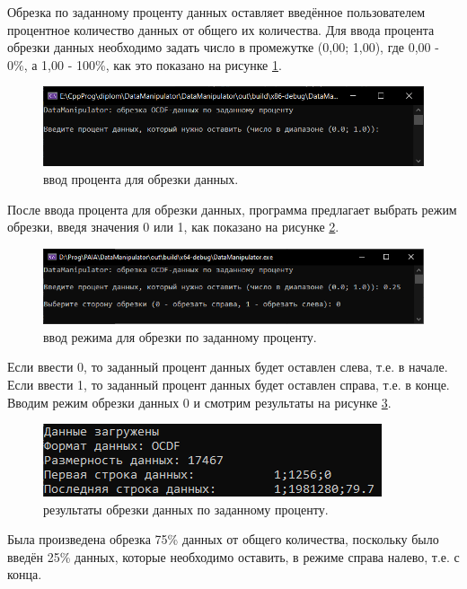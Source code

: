 {\standartFont

  \par Обрезка по заданному проценту данных оставляет введённое пользователем процентное количество данных от общего их количества. Для ввода процента обрезки данных необходимо задать число в промежутке (0,00; 1,00), где 0,00 - 0\%, а 1,00 - 100\%, как это показано на рисунке \ref{fig:OCDFcutper1}. 

  \begin{figure}[H]
    \centering
    \includegraphics{images/forDataManipulator/OCDFcutpercentstage1.png}
    \caption{ввод процента для обрезки данных.} 
    \label{fig:OCDFcutper1}
  \end{figure}

  \par После ввода процента для обрезки данных, программа предлагает выбрать режим обрезки, введя значения 0 или 1, как показано на рисунке \ref{fig:OCDFcutper2}. 

  \begin{figure}[H]
    \centering
    \includegraphics[width=\textwidth]{images/forDataManipulator/OCDFcutpercentstage2.png}
    \caption{ввод режима для обрезки по заданному проценту.} 
    \label{fig:OCDFcutper2}
  \end{figure}

  \par Если ввести 0, то заданный процент данных будет оставлен слева, т.е. в начале. Если ввести 1, то заданный процент данных будет оставлен справа, т.е. в конце. Вводим режим обрезки данных 0 и смотрим результаты на рисунке \ref{fig:ExOCDFdataAftCatPer}. 

  \begin{figure}[H]
    \centering
    \includegraphics{images/forDataManipulator/ExOCDFdataAftCatPer.png}
    \caption{результаты обрезки данных по заданному проценту.} 
    \label{fig:ExOCDFdataAftCatPer}
  \end{figure}

  \par Была произведена обрезка 75\% данных от общего количества, поскольку было введён 25\% данных, которые необходимо оставить, в режиме справа налево, т.е. с конца. 

  \par 
}

